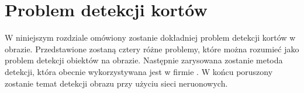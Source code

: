 \chapter{Problem detekcji kortów}

W niniejszym rozdziale omówiony zostanie dokładniej problem detekcji kortów w obrazie.
Przedstawione zostaną cztery różne problemy, które można rozumieć jako problem detekcji obiektów na obrazie.
Następnie zarysowana zostanie metoda detekcji, która obecnie wykorzystywana jest w firmie \blue{}.
W końcu poruszony zostanie temat detekcji obrazu przy użyciu sieci neruonowych.
